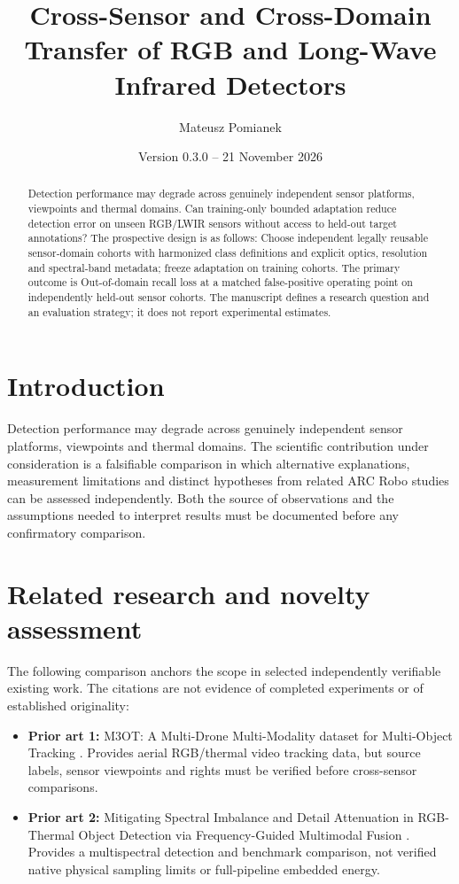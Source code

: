 \documentclass[11pt,a4paper]{article}
\title{Cross-Sensor and Cross-Domain Transfer of RGB and Long-Wave Infrared Detectors}
\author{Mateusz Pomianek}
\date{Version 0.3.0 -- 21 November 2026}
\begin{document}
\maketitle

\begin{abstract}
Detection performance may degrade across genuinely independent sensor platforms, viewpoints and thermal domains. Can training-only bounded adaptation reduce detection error on unseen RGB/LWIR sensors without access to held-out target annotations? The prospective design is as follows: Choose independent legally reusable sensor-domain cohorts with harmonized class definitions and explicit optics, resolution and spectral-band metadata; freeze adaptation on training cohorts. The primary outcome is Out-of-domain recall loss at a matched false-positive operating point on independently held-out sensor cohorts. The manuscript defines a research question and an evaluation strategy; it does not report experimental estimates.
\end{abstract}

\section{Introduction}
Detection performance may degrade across genuinely independent sensor platforms, viewpoints and thermal domains. The scientific contribution under consideration is a falsifiable comparison in which alternative explanations, measurement limitations and distinct hypotheses from related ARC Robo studies can be assessed independently. Both the source of observations and the assumptions needed to interpret results must be documented before any confirmatory comparison.

\section{Related research and novelty assessment}
The following comparison anchors the scope in selected independently verifiable existing work. The citations are not evidence of completed experiments or of established originality:
\begin{itemize}
\item \textbf{Prior art 1:} M3OT: A Multi-Drone Multi-Modality dataset for Multi-Object Tracking \cite{source1}. Provides aerial RGB/thermal video tracking data, but source labels, sensor viewpoints and rights must be verified before cross-sensor comparisons.
\item \textbf{Prior art 2:} Mitigating Spectral Imbalance and Detail Attenuation in RGB-Thermal Object Detection via Frequency-Guided Multimodal Fusion \cite{source2}. Provides a multispectral detection and benchmark comparison, not verified native physical sampling limits or full-pipeline embedded energy.
\end{itemize}
\end{document}
